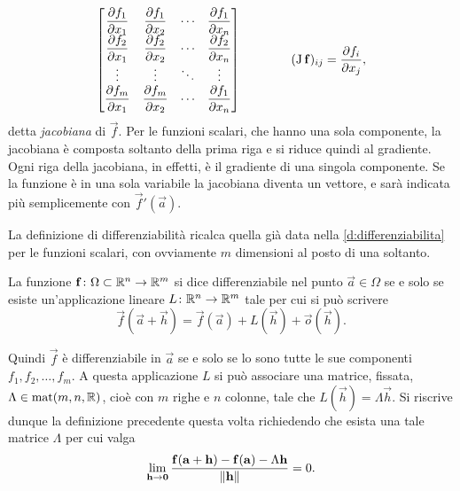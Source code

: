 \[
\begin{bmatrix} %
\dfrac{\partial f_1}{\partial x_1} &\dfrac{\partial f_1}{\partial x_2} &\cdots &\dfrac{\partial f_1}{\partial x_n}\\
\dfrac{\partial f_2}{\partial x_1} &\dfrac{\partial f_2}{\partial x_2} &\cdots &\dfrac{\partial f_2}{\partial x_n}\\
\vdots                             &\vdots                             &\ddots &\vdots\\
\dfrac{\partial f_m}{\partial x_1} &\dfrac{\partial f_m}{\partial x_2} &\cdots &\dfrac{\partial f_1}{\partial x_n}
\end{bmatrix}\qquad\qquad(\jac\vec f)_{ij}=\dfrac{\partial f_i}{\partial x_j},
\]
detta \emph{jacobiana} di $\vec f$. Per le funzioni scalari, che hanno una sola componente, la jacobiana è composta soltanto della prima riga e si riduce quindi al gradiente. Ogni riga della jacobiana, in effetti, è il gradiente di una singola componente. Se la funzione è in una sola variabile la jacobiana diventa un vettore, e sarà indicata più semplicemente con $\vec f'(\vec a)$.

La definizione di differenziabilità ricalca quella già data nella \ref{d:differenziabilita} per le funzioni scalari, con ovviamente $m$ dimensioni al posto di una soltanto.
\begin{definizione}
La funzione $\mathbf{f}\colon\Omega\subset\mathbb{R}^n\to\mathbb{R}^m$ si dice differenziabile nel punto $\vec a\in\Omega$ se e solo se esiste un'applicazione lineare $L\colon\mathbb{R}^n\to\mathbb{R}^m$ tale per cui si può scrivere
\begin{equation} \label{eq:differenziabilita-app-vett}
\vec f(\vec a+\vec h)=\vec f(\vec a)+L(\vec h)+\vec o(\vec h).
\end{equation}
\end{definizione}
Quindi $\vec f$ è differenziabile in $\vec a$ se e solo se lo sono tutte le sue componenti $f_1,f_2,\dots,f_m$.
A questa applicazione $L$ %
si può associare una matrice, fissata, $\Lambda\in\operatorname{mat}(m,n,\mathbb{R})$, cioè con $m$ righe e $n$ colonne, tale che $L(\vec h)=\Lambda\vec h$. Si riscrive dunque la definizione precedente questa volta richiedendo che esista una tale matrice $\Lambda$ per cui valga
\begin{equation} \label{eq:differenziabilita-vett}
\lim_{\mathbf{h}\to\mathbf{0}}\frac{\mathbf{f}(\mathbf{a}+\mathbf{h})-\mathbf{f}(\mathbf{a})-\Lambda\mathbf{h}}{\lVert\mathbf{h}\rVert}=0.
\end{equation}

